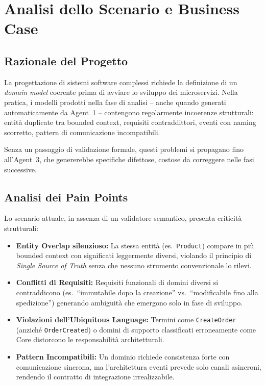 \documentclass[12pt,a4paper]{report}
\begin{document}
\chapter{Analisi dello Scenario e Business Case}

\section{Razionale del Progetto}

La progettazione di sistemi software complessi richiede la definizione di un \textit{domain
model} coerente prima di avviare lo sviluppo dei microservizi. Nella pratica, i modelli
prodotti nella fase di analisi -- anche quando generati automaticamente da Agent~1 --
contengono regolarmente incoerenze strutturali: entità duplicate tra bounded context,
requisiti contraddittori, eventi con naming scorretto, pattern di comunicazione
incompatibili.

Senza un passaggio di validazione formale, questi problemi si propagano fino all'Agent~3,
che genererebbe specifiche difettose, costose da correggere nelle fasi successive.

\section{Analisi dei Pain Points}

Lo scenario attuale, in assenza di un validatore semantico, presenta criticità strutturali:

\begin{itemize}
  \item \textbf{Entity Overlap silenzioso:} La stessa entità (es.\ \texttt{Product})
        compare in più bounded context con significati leggermente diversi, violando
        il principio di \textit{Single Source of Truth} senza che nessuno strumento
        convenzionale lo rilevi.

  \item \textbf{Conflitti di Requisiti:} Requisiti funzionali di domini diversi si
        contraddicono (es.\ ``immutabile dopo la creazione'' vs.\ ``modificabile fino
        alla spedizione'') generando ambiguità che emergono solo in fase di sviluppo.

  \item \textbf{Violazioni dell'Ubiquitous Language:} Termini come
        \texttt{CreateOrder} (anziché \texttt{OrderCreated}) o domini di supporto
        classificati erroneamente come Core distorcono le responsabilità architetturali.

  \item \textbf{Pattern Incompatibili:} Un dominio richiede consistenza forte con
        comunicazione sincrona, ma l'architettura eventi prevede solo canali asincroni,
        rendendo il contratto di integrazione irrealizzabile.
\end{itemize}
\end{document}
